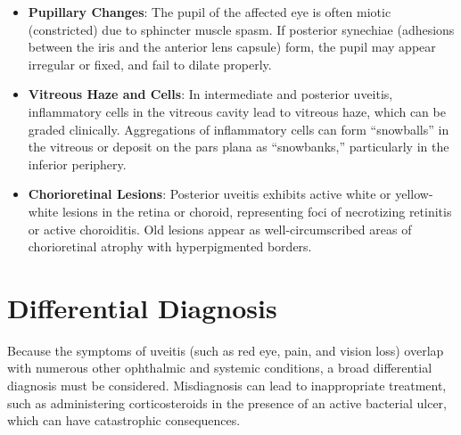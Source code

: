 \begin{itemize}
    \item \textbf{Pupillary Changes}: The pupil of the affected eye is often miotic (constricted) due to sphincter muscle spasm. If posterior synechiae (adhesions between the iris and the anterior lens capsule) form, the pupil may appear irregular or fixed, and fail to dilate properly.
    \item \textbf{Vitreous Haze and Cells}: In intermediate and posterior uveitis, inflammatory cells in the vitreous cavity lead to vitreous haze, which can be graded clinically. Aggregations of inflammatory cells can form ``snowballs'' in the vitreous or deposit on the pars plana as ``snowbanks,'' particularly in the inferior periphery.
    \item \textbf{Chorioretinal Lesions}: Posterior uveitis exhibits active white or yellow-white lesions in the retina or choroid, representing foci of necrotizing retinitis or active choroiditis. Old lesions appear as well-circumscribed areas of chorioretinal atrophy with hyperpigmented borders.
\end{itemize}

\section*{Differential Diagnosis}
Because the symptoms of uveitis (such as red eye, pain, and vision loss) overlap with numerous other ophthalmic and systemic conditions, a broad differential diagnosis must be considered. Misdiagnosis can lead to inappropriate treatment, such as administering corticosteroids in the presence of an active bacterial ulcer, which can have catastrophic consequences.

